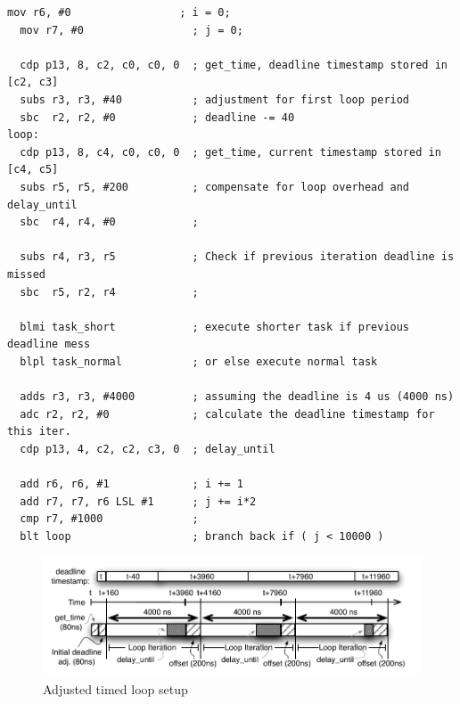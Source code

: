 \begin{lstlisting}[float=h, label=lst:timed_loop_compensate_adj,caption=Jitter adjusted timed loop ]
  mov r6, #0                 ; i = 0;
  mov r7, #0                 ; j = 0;
  
  cdp p13, 8, c2, c0, c0, 0  ; get_time, deadline timestamp stored in [c2, c3]
  subs r3, r3, #40           ; adjustment for first loop period 
  sbc  r2, r2, #0            ; deadline -= 40
loop:
  cdp p13, 8, c4, c0, c0, 0  ; get_time, current timestamp stored in [c4, c5]
  subs r5, r5, #200          ; compensate for loop overhead and delay_until 
  sbc  r4, r4, #0            ; 

  subs r4, r3, r5            ; Check if previous iteration deadline is missed
  sbc  r5, r2, r4            ; 

  blmi task_short            ; execute shorter task if previous deadline mess 
  blpl task_normal           ; or else execute normal task 
  
  adds r3, r3, #4000         ; assuming the deadline is 4 us (4000 ns)
  adc r2, r2, #0             ; calculate the deadline timestamp for this iter.
  cdp p13, 4, c2, c2, c3, 0  ; delay_until
	
  add r6, r6, #1             ; i += 1    
  add r7, r7, r6 LSL #1      ; j += i*2  
  cmp r7, #1000              ; 
  blt loop                   ; branch back if ( j < 10000 )
\end{lstlisting} 

\begin{figure}[h]
  \vspace{-3mm}
  \begin{center}
    \includegraphics[scale=.9]{figs/setup_loop_timing_adj}
  \end{center}
  \vspace{-3mm}
  \caption{Adjusted timed loop setup}
  \label{fig:setup_look_timing_adj}
\end{figure}

